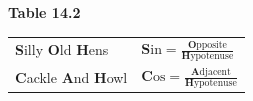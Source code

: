 {{\begin{center}
\begin{tabular}[t]{|l|l|}
     \tabularnewline\cline{1-1}\cline{2-2}
    \end{tabular}
      \end{center}
    \begin{center}{\small\bfseries Table 14.2}\end{center}
          }{ %
        \begin{center}
      \label{m39408*id79953}
    \noindent
      \tablelasttail{}
      \begin{xtabular}[t]{|l|l|}\hline
        \textbf{S}illy \textbf{O}ld \textbf{H}ens &
                  $\mathbf{S}\mathrm{in}=\frac{\mathbf{O}\mathrm{pposite}}{\mathbf{H}\mathrm{ypotenuse}}$
     \tabularnewline{}
        \textbf{C}ackle \textbf{A}nd \textbf{H}owl &
                  $\mathbf{C}\mathrm{os}=\frac{\mathbf{A}\mathrm{djacent}}{\mathbf{H}\mathrm{ypotenuse}}$
     \tabularnewline{}

\end{xtabular}
\end{center}}}
